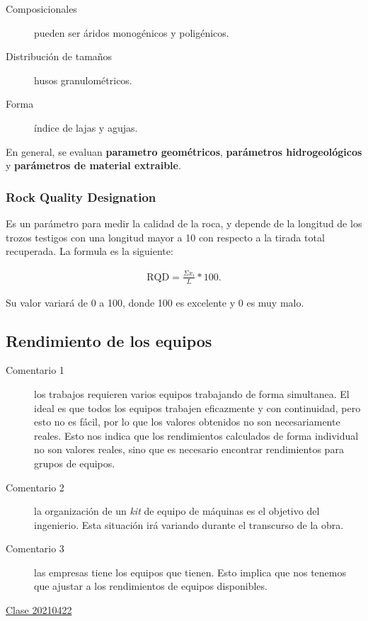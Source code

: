 \documentclass[../main.tex]{subfiles}
\begin{document}
\begin{description}
  \item[Composicionales] pueden ser áridos monogénicos y poligénicos. 
  \item[Distribución de tamaños] husos granulométricos.
  \item[Forma] índice de lajas y agujas.
\end{description}

En general, se evaluan \textbf{parametro geométricos}, \textbf{parámetros hidrogeológicos} 
y \textbf{parámetros de material extraible}.

\subsubsection{Rock Quality Designation}

Es un parámetro para medir la calidad de la roca, y depende de la longitud de 
los trozos testigos con una longitud mayor a 10 con respecto a la tirada total
recuperada. La formula es la siguiente:

\begin{align*}
  \text{RQD} = \frac{\Sigma x_{i}}{L}*100
.\end{align*}

Su valor variará de 0 a 100, donde 100 es excelente y 0 es muy malo.


\subsection{Rendimiento de los equipos}

\begin{description}
  \item[Comentario 1] los trabajos requieren varios equipos trabajando de forma
    simultanea. El ideal es que todos los equipos trabajen eficazmente y con
    continuidad, pero esto no es fácil, por lo que los valores obtenidos no son
    necesariamente reales. Esto nos indica que los rendimientos calculados de
    forma individual no son valores reales, sino que es necesario encontrar 
    rendimientos para grupos de equipos.

  \item[Comentario 2] la organización de un \textit{kit} de equipo de máquinas
    es el objetivo del ingenierio. Esta situación irá variando durante el transcurso
    de la obra. 

  \item[Comentario 3] las empresas tiene los equipos que tienen. Esto implica que
    nos tenemos que ajustar a los rendimientos de equipos disponibles. 
\end{description}


\href{https://youtu.be/zlrogWSgd9k}{Clase 20210422}
\end{document}
